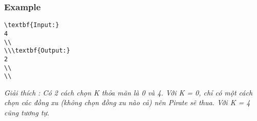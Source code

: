 \subsubsection{   Example  }
\begin{verbatim}
\textbf{Input:}
4
\\
\\\textbf{Output:}
2
\\
\\\end{verbatim}

\emph{     Giải thích        : Có 2 cách chọn K thỏa mãn là 0 và 4. Với K = 0, chỉ có một cách chọn các đồng xu (không chọn đồng xu nào cả) nên Pirate sẽ thua. Với K = 4 cũng tương tự.    
\\}
